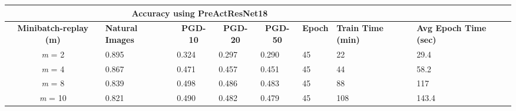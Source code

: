 \documentclass{article}
\begin{document}
\begin{table}[hbt!]
\begin{tabular}{|c|l|l|l|l|l|l|p{2cm}|}
\hline
\multicolumn{1}{|l|}{{ }}        & \multicolumn{4}{c|}{{ \textbf{Accuracy using PreActResNet18}}}                                                                                                                                                                            & \multicolumn{3}{l|}{{ }}                                                                                                                                                       \\ \hline
{ \textbf{Minibatch-replay (m)}} & \multicolumn{1}{p{1.5cm}|}{{ \textbf{Natural Images}}} & \multicolumn{1}{c|}{{ \textbf{PGD-10}}} & \multicolumn{1}{c|}{{ \textbf{PGD-20}}} & \multicolumn{1}{c|}{{ \textbf{PGD-50}}} & \multicolumn{1}{c|}{{ \textbf{Epoch}}} & \multicolumn{1}{p{1.5cm}|}{{ \textbf{Train Time (min)}}} & \multicolumn{1}{p{1.5cm}|}{{ \textbf{Avg Epoch Time (sec)}}} \\ \hline
{ \textit{m} = 2}                & { 0.895}                                        & { 0.324}                                & { 0.297}                                & { 0.290}                                & { 45}                                  & { 22 }                               & { 29.4 }                                 \\ \hline
{ \textit{m} = 4}                & { 0.867}                                        & { 0.471}                                & { 0.457}                                & { 0.451}                                & { 45}                                  & { 44 }                               & { 58.2 }                                 \\ \hline
{ \textit{m} = 8}                & { 0.839}                                        & { 0.498}                                & { 0.486}                                & { 0.483}                                & { 45}                                  & { 88 }                               & { 117 }                                  \\ \hline
{ \textit{m} = 10}               & { 0.821}                                        & { 0.490}                                & { 0.482}                                & { 0.479}                                & { 45}                                  & { 108 }                              & { 143.4 }                                \\ \hline
\end{tabular}
\end{table}
\end{document}
